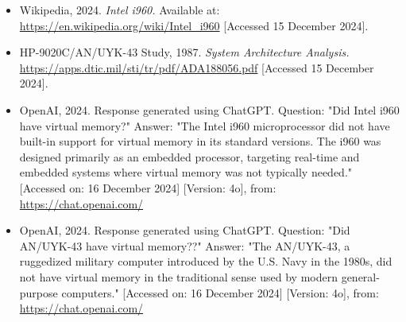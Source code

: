 \documentclass{article}
\begin{document}
\begin{itemize}
\item Wikipedia, 2024. \textit{Intel i960.} Available at: \url{https://en.wikipedia.org/wiki/Intel_i960} [Accessed 15 December 2024].

\item HP-9020C/AN/UYK-43 Study, 1987. \textit{System Architecture Analysis.} \url{https://apps.dtic.mil/sti/tr/pdf/ADA188056.pdf} [Accessed 15 December 2024].

\item OpenAI, 2024. Response generated using ChatGPT. Question: "Did Intel i960 have virtual memory?" Answer: "The Intel i960 microprocessor did not have built-in support for virtual memory in its standard versions. The i960 was designed primarily as an embedded processor, targeting real-time and embedded systems where virtual memory was not typically needed." [Accessed on: 16 December 2024] [Version: 4o], from: \url{https://chat.openai.com/}

\item OpenAI, 2024. Response generated using ChatGPT. Question: "Did AN/UYK-43 have virtual memory??" Answer: "The AN/UYK-43, a ruggedized military computer introduced by the U.S. Navy in the 1980s, did not have virtual memory in the traditional sense used by modern general-purpose computers." [Accessed on: 16 December 2024] [Version: 4o], from: \url{https://chat.openai.com/}

\end{itemize}
\end{document}
